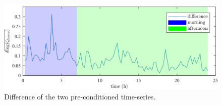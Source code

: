 \begin{figure}\centering
	\includegraphics{_appendices/_a1/fig/averaged-log-cost-difference}
	\caption{Difference of the two pre-conditioned time-series.}
	\label{appx-a:ch1:fig:split-averaged-log-data-difference}
\end{figure}